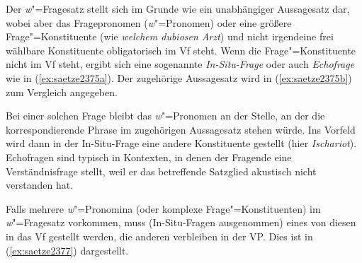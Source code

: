 \begin{exe}
  \ex\label{ex:saetze2374} 
  \begin{xlist}
  \end{xlist}
\end{exe}

\label{abs:923478} Der \textit{w}"=Fragesatz stellt sich im Grunde wie ein unabhängiger Aussagesatz dar, wobei aber das Fragepronomen (\textit{w}"=Pronomen) oder eine größere Frage"=Konstituente (wie \textit{welchem dubiosen Arzt}) und nicht irgendeine frei wählbare Konstituente obligatorisch im Vf steht.
Wenn die Frage"=Konstituente nicht im Vf steht, ergibt sich eine sogenannte \textit{In-Situ-Frage} oder auch \textit{Echofrage} wie in (\ref{ex:saetze2375a}).
Der zugehörige Aussagesatz wird in (\ref{ex:saetze2375b}) zum Vergleich angegeben.

\begin{exe}
  \ex\label{ex:saetze2375}
  \begin{xlist}
  \end{xlist}
\end{exe}

Bei einer solchen Frage bleibt das \textit{w}"=Pronomen an der Stelle, an der die korrespondierende Phrase im zugehörigen Aussagesatz stehen würde.
Ins Vorfeld wird dann in der In-Situ-Frage eine andere Konstituente gestellt (hier \zB \textit{Ischariot}).
Echofragen sind typisch in Kontexten, in denen der Fragende eine Verständnisfrage stellt, weil er das betreffende Satzglied \zB akustisch nicht verstanden hat.

Falls mehrere \textit{w}"=Pronomina (oder komplexe Frage"=Konstituenten) im \textit{w}"=Fragesatz vorkommen, muss (In-Situ-Fragen ausgenommen) eines von diesen in das Vf gestellt werden, die anderen verbleiben in der VP.
Dies ist in (\ref{ex:saetze2377}) dargestellt.

\begin{exe}
  \ex\label{ex:saetze2377}
  \begin{xlist}
  \end{xlist}
\end{exe}

